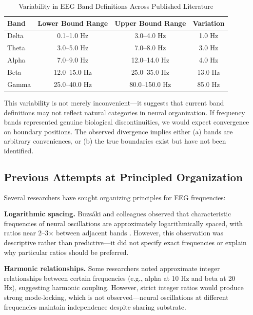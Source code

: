 \documentclass[11pt,a4paper]{article}
\begin{document}
\begin{table}[H]
\centering
\caption{Variability in EEG Band Definitions Across Published Literature}
\label{tab:band_variability}
\begin{tabular}{@{}lccc@{}}
\toprule
Band & Lower Bound Range & Upper Bound Range & Variation \\
\midrule
Delta & 0.1--1.0 Hz & 3.0--4.0 Hz & 1.0 Hz \\
Theta & 3.0--5.0 Hz & 7.0--8.0 Hz & 3.0 Hz \\
Alpha & 7.0--9.0 Hz & 12.0--14.0 Hz & 4.0 Hz \\
Beta & 12.0--15.0 Hz & 25.0--35.0 Hz & 13.0 Hz \\
Gamma & 25.0--40.0 Hz & 80.0--150.0 Hz & 85.0 Hz \\
\bottomrule
\end{tabular}
\end{table}

This variability is not merely inconvenient---it suggests that current band definitions may not reflect natural categories in neural organization. If frequency bands represented genuine biological discontinuities, we would expect convergence on boundary positions. The observed divergence implies either (a) bands are arbitrary conveniences, or (b) the true boundaries exist but have not been identified.

\subsection{Previous Attempts at Principled Organization}

Several researchers have sought organizing principles for EEG frequencies:

\textbf{Logarithmic spacing.} Buzs\'{a}ki and colleagues observed that characteristic frequencies of neural oscillations are approximately logarithmically spaced, with ratios near 2--3$\times$ between adjacent bands \citep{buzsaki2006, penttonen2003}. However, this observation was descriptive rather than predictive---it did not specify exact frequencies or explain why particular ratios should be preferred.

\textbf{Harmonic relationships.} Some researchers noted approximate integer relationships between certain frequencies (e.g., alpha at 10 Hz and beta at 20 Hz), suggesting harmonic coupling. However, strict integer ratios would produce strong mode-locking, which is not observed---neural oscillations at different frequencies maintain independence despite sharing substrate.
\end{document}
